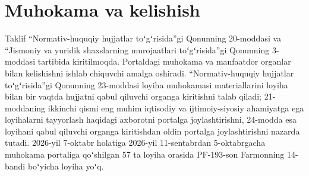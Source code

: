 \documentclass[14pt,a4paper]{extarticle}
\begin{document}
\section{Muhokama va kelishish}
Taklif “Normativ-huquqiy hujjatlar toʻgʻrisida”gi Qonunning 20-moddasi va “Jismoniy va yuridik shaxslarning murojaatlari toʻgʻrisida”gi Qonunning 3-moddasi tartibida kiritilmoqda. Portaldagi muhokama va manfaatdor organlar bilan kelishishni ishlab chiquvchi amalga oshiradi. “Normativ-huquqiy hujjatlar toʻgʻrisida”gi Qonunning 23-moddasi loyiha muhokamasi materiallarini loyiha bilan bir vaqtda hujjatni qabul qiluvchi organga kiritishni talab qiladi; 21-moddaning ikkinchi qismi eng muhim iqtisodiy va ijtimoiy-siyosiy ahamiyatga ega loyihalarni tayyorlash haqidagi axborotni portalga joylashtirishni, 24-modda esa loyihani qabul qiluvchi organga kiritishdan oldin portalga joylashtirishni nazarda tutadi\cite{orq682}. 2026-yil 7-oktabr holatiga 2026-yil 11-sentabrdan 5-oktabrgacha muhokama portaliga qoʻshilgan 57 ta loyiha orasida PF-193-son Farmonning 14-bandi boʻyicha loyiha yoʻq\cite{portal}.
\end{document}
